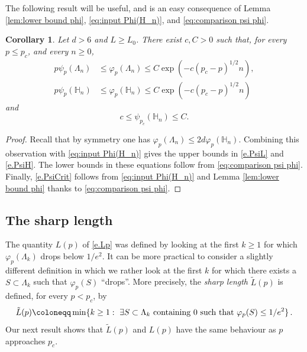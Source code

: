 \documentclass[11pt,a4paper]{article}
\numberwithin{equation}{section}
\theoremstyle{plain}
\newtheorem{Coro}[Thm]{Corollary}
\theoremstyle{definition}
\newcommand{\1}{\mathbf 1}
\def\H{\mathbb{H}}
\begin{document}
The following result will be useful, and is an easy consequence of Lemma \ref{lem:lower bound phi}, \eqref{eq:input Phi(H_n)}, and \eqref{eq:comparison psi phi}.
\begin{Coro}\label{coro:bounds on psi}
 Let $d>6$ and $L\geq L_0$. There exist $c,C>0$ such that, for every $p\leq p_c$, and every $n\geq 0$, 
\begin{align}
	 p \psi_p(\Lambda_n) & \leq   \varphi_p(\Lambda_n)  \leq C \exp\left( - c (p_c-p)^{1/2} n\right),\label{e.PsiL} \\
	 p \psi_p(\H_n) & \leq   \varphi_p(\H_n)  \leq C \exp\left( - c (p_c-p)^{1/2} n\right)\label{e.PsiH}\,
\end{align}
and
\begin{equation}\label{e.PsiCrit}
	c\leq \psi_{p_c}(\mathbb H_n)\leq C.
\end{equation}
\end{Coro}
\begin{proof} Recall that by symmetry one has $\varphi_p(\Lambda_n)\leq 2d\varphi_p(\mathbb H_n)$. Combining this observation with \eqref{eq:input Phi(H_n)} gives the upper bounds in \eqref{e.PsiL} and \eqref{e.PsiH}. The lower bounds in these equations follow from \eqref{eq:comparison psi phi}. Finally, \eqref{e.PsiCrit} follows from \eqref{eq:input Phi(H_n)} and Lemma \ref{lem:lower bound phi} thanks to \eqref{eq:comparison psi phi}.
\end{proof}

\subsection{The sharp length}
The quantity $L(p)$ of \eqref{e.Lp} was defined by looking at the first $k\geq 1$ for which $\varphi_p(\Lambda_k)$ drops below $1/e^2$. It can be more practical to consider a slightly different definition in which we rather look at the first $k$ for which there exists a $S\subset \Lambda_k$ such that $\varphi_p(S)$ ``drops''. More precisely, the \emph{sharp length} $\tilde{L}(p)$ is defined, for every $p<p_c$, by
\begin{equation}\label{e.Lp2}
	\tilde L(p)  \coloneqq \min \{k\geq1:~\exists  S \subset \Lambda_k \textup{ containing $0$ such that } \varphi_p(S)\leq 1/e^2\}\,.
\end{equation}
Our next result shows that $\tilde{L}(p)$ and $L(p)$ have the same behaviour as $p$ approaches $p_c$.
\end{document}
